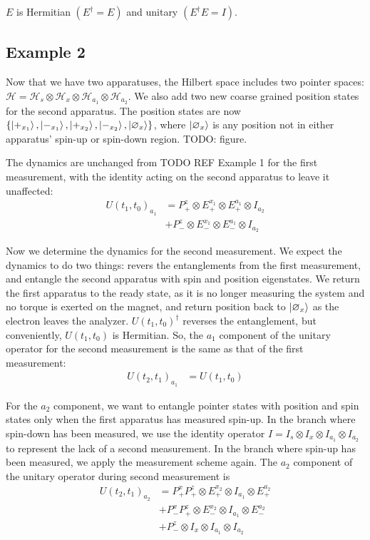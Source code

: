 $E$ is Hermitian $\left(E^\dagger = E\right)$ and unitary $\left( E^\dagger E = I \right)$.

\subsection{Example 2}
Now that we have two apparatuses, the Hilbert space includes two pointer spaces: $\mathcal{H} = \mathcal{H}_s \otimes \mathcal{H}_x \otimes \mathcal{H}_{a_1} \otimes \mathcal{H}_{a_2}$. We also add two new coarse grained position states for the second apparatus. The position states are now $\{\ket{+_{x_1}}, \ket{-_{x_1}}, \ket{+_{x_2}}, \ket{-_{x_2}}, \ket{\varnothing_x}\}$, where $\ket{\varnothing_x}$ is any position not in either apparatus' spin-up or spin-down region. TODO: figure.

The dynamics are unchanged from TODO REF Example 1 for the first measurement, with the identity acting on the second apparatus to leave it unaffected:
\begin{align}
  U(t_1, t_0)_{a_1} &= P^z_+ \otimes E^{x_1}_+  \nonumber \otimes E^{a_1}_+ \otimes I_{a_2}\\ \nonumber
  &+ P^z_- \otimes E^{x_1}_-\otimes E^{a_1}_- \otimes I_{a_2}
\end{align}

Now we determine the dynamics for the second measurement. We expect the dynamics to do two things: revers the entanglements from the first measurement, and entangle the second apparatus with spin and position eigenstates. We return the first apparatus to the ready state, as it is no longer measuring the system and no torque is exerted on the magnet, and return position back to $\ket{\varnothing_x}$ as the electron leaves the analyzer. $U(t_1, t_0)^\dagger$ reverses the entanglement, but conveniently, $U(t_1, t_0)$ is Hermitian. So, the $a_1$ component of the unitary operator for the second measurement is the same as that of the first measurement:
\begin{align}
  U(t_2, t_1)_{a_1} &= U(t_1, t_0)
\end{align}

For the $a_2$ component, we want to entangle pointer states with position and spin states only when the first apparatus has measured spin-up. In the branch where spin-down has been measured, we use the identity operator $I = I_s \otimes I_x \otimes I_{a_1} \otimes I_{a_2}$ to represent the lack of a second measurement. In the branch where spin-up has been measured, we apply the measurement scheme again. The $a_2$ component of the unitary operator during second measurement is
\begin{align}
  U(t_2, t_1)_{a_2} &= P^x_+ P^z_+ \otimes E^{x_2}_+ \otimes I_{a_1} \otimes E^{a_2}_+ \\ \nonumber
  &+ P^x_- P^z_+ \otimes E^{x_2}_- \otimes I_{a_1} \otimes E^{a_2}_- \\ \nonumber
  &+ P^z_- \otimes{I_x} \otimes I_{a_1} \otimes I_{a_2}
\end{align}

